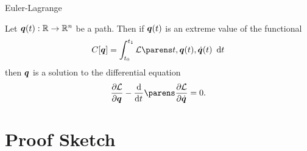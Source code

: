 \documentclass{fkpresentation}
\begin{document}



\begin{frame}{Euler-Lagrange}
  \begin{theorem}
    Let $\bm q(t) : \mathbb{R} \to \mathbb{R}^n$ be a path. Then if $\bm q(t)$ is an
    extreme value of the functional
    \[
      C[\Qq] = \int_{t_0}^{t_1} \mc L\pn{t, \Qq(t), \dot{\Qq}(t)} \dd
      t
    \]
    then $\bm q$ is a solution to the differential equation
    \[
      \pd{\mc L}{\Qq} - \od{}{t} \pn{\pd{\mc L}{\dot{\Qq}}} = 0.
    \]
  \end{theorem}
\end{frame}

\section{Proof Sketch}
\end{document}

